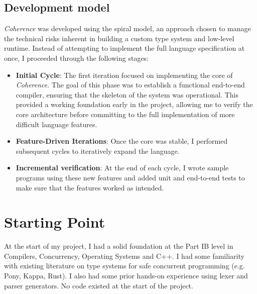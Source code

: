 \subsection{Development model}
\textit{Coherence} was developed using the spiral model, an approach chosen to manage the technical risks inherent in building a custom type system and low-level runtime. Instead of attempting to implement the full language specification at once, I proceeded through the following stages:

\begin{itemize}
    \item \textbf{Initial Cycle}: The first iteration focused on implementing the core of \textit{Coherence}. The goal of this phase was to establish a functional end-to-end compiler, ensuring that the skeleton of the system was operational. This provided a working foundation early in the project, allowing me to verify the core architecture before committing to the full implementation of more difficult language features.
    \item \textbf{Feature-Driven Iterations}: Once the core was stable, I performed subsequent cycles to iteratively expand the language.
    \item \textbf{Incremental verification}: At the end of each cycle, I wrote sample programs using these new features and added unit and end-to-end tests to make sure that the features worked as intended.
\end{itemize}

\section{Starting Point} \label{sec:starting_point}
At the start of my project, I had a solid foundation at the Part IB level in Compilers, Concurrency, Operating Systems and C++. I had some familiarity with existing literature on type systems for safe concurrent programming (e.g. Pony, Kappa, Rust). I also had some prior hands-on experience using lexer and parser generators. No code existed at the start of the project.
